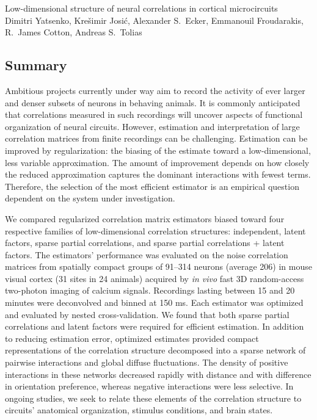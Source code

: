 \documentclass[12pt]{amsart}
\begin{document}
\begin{flushleft}
{\Large
Low-dimensional structure of neural correlations in cortical microcircuits
}
\\
\vspace{6pt}
Dimitri Yatsenko, 
Kre\v{s}imir Josi\'{c},
Alexander S.~Ecker,
Emmanouil Froudarakis,
R.~James Cotton,
Andreas S.~Tolias
\end{flushleft}
\subsection*{Summary}
Ambitious projects currently under way aim to record the activity of ever larger and denser subsets of neurons in behaving animals.  It is commonly anticipated that correlations measured in such recordings will uncover aspects of functional organization of neural circuits.  However, estimation and interpretation of large correlation matrices from finite recordings can be challenging.  Estimation can be improved by regularization: the biasing of the estimate toward a low-dimensional, less variable approximation.  The amount of improvement depends on how closely the reduced approximation captures the dominant interactions with fewest terms. Therefore, the selection of the most efficient estimator is an empirical question dependent on the system under investigation. 

We compared regularized correlation matrix estimators biased toward four respective families of low-dimensional correlation structures: independent, latent factors, sparse partial correlations, and sparse partial correlations + latent factors.  The estimators' performance was evaluated on the noise correlation matrices from spatially compact groups of 91--314 neurons (average 206) in mouse visual cortex (31 sites in 24 animals) acquired by \emph{in vivo} fast 3D random-access two-photon imaging of calcium signals. Recordings lasting between 15 and 20 minutes were deconvolved and binned at 150 ms. Each estimator was optimized and evaluated by nested cross-validation.  We found that both sparse partial correlations and latent factors were required for efficient estimation.  In addition to reducing estimation error, optimized estimates provided compact representations of the correlation structure decomposed into a sparse network of pairwise interactions and global diffuse fluctuations. The density of positive interactions in these networks decreased rapidly with distance and with difference in orientation preference, whereas negative interactions were less selective. In ongoing studies, we seek to relate these elements of the correlation structure to circuits' anatomical organization, stimulus conditions, and brain states.
\end{document}
